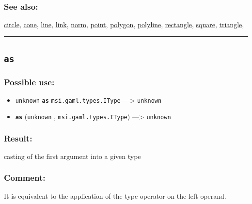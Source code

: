 \documentclass[]{book}
\providecommand{\tightlist}{%
  \setlength{\itemsep}{0pt}\setlength{\parskip}{0pt}}
\theoremstyle{definition}
\theoremstyle{definition}
\theoremstyle{definition}
\theoremstyle{remark}
\begin{document}
\subsubsection{See also:}\label{see-also-28}

\href{operators-b-to-c.html\#circle}{circle},
\href{operators-b-to-c.html\#cone}{cone},
\href{operators-i-to-m.html\#line}{line},
\href{operators-i-to-m.html\#link}{link},
\href{operators-n-to-r.html\#norm}{norm},
\href{operators-n-to-r.html\#point}{point},
\href{operators-n-to-r.html\#polygon}{polygon},
\href{operators-n-to-r.html\#polyline}{polyline},
\href{operators-n-to-r.html\#rectangle}{rectangle},
\href{operators-s-to-z.html\#square}{square},
\href{operators-s-to-z.html\#triangle}{triangle},

\begin{center}\rule{0.5\linewidth}{\linethickness}\end{center}

\subsection{\texorpdfstring{\texttt{as}}{as}}\label{as}

\subsubsection{Possible use:}\label{possible-use-43}

\begin{itemize}
\tightlist
\item
  \texttt{unknown} \textbf{\texttt{as}} \texttt{msi.gaml.types.IType}
  ---\textgreater{} \texttt{unknown}
\item
  \textbf{\texttt{as}} (\texttt{unknown} ,
  \texttt{msi.gaml.types.IType}) ---\textgreater{} \texttt{unknown}
\end{itemize}

\subsubsection{Result:}\label{result-42}

casting of the first argument into a given type

\subsubsection{Comment:}\label{comment-8}

It is equivalent to the application of the type operator on the left
operand.
\end{document}
